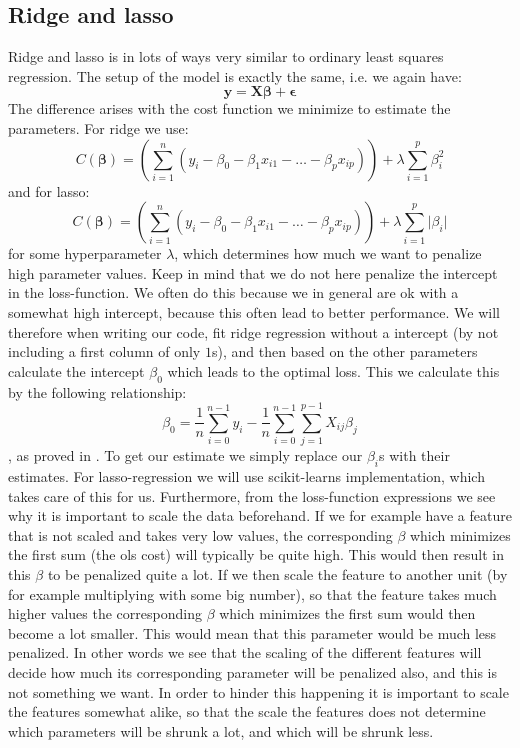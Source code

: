 \documentclass{article}
\begin{document}
\subsection{Ridge and lasso}
\label{ridge-lasso-model-sec}
Ridge and lasso is in lots of ways very similar to ordinary least squares
regression. The setup of the model is exactly the same, i.e. we again have:
$$\mathbf{y} = \mathbf{X} \bm{\beta} + \bm{\epsilon}$$
The difference arises with the cost function we minimize to estimate the parameters. For ridge we use:
$$C(\bm{\beta}) = \left(\sum_{i=1}^{n} (y_i - \beta_0 - \beta_1 x_{i 1} - \dots - \beta_{p} x_{i p})\right) + \lambda \sum_{i=1}^p \beta_i^2$$
and for lasso:
$$C(\bm{\beta}) = \left(\sum_{i=1}^{n} (y_i - \beta_0 - \beta_1 x_{i 1} - \dots - \beta_{p} x_{i p})\right) + \lambda \sum_{i=1}^p \lvert \beta_i \rvert$$
for some hyperparameter $\lambda$, which determines how much we want to penalize
high parameter values. Keep in mind that we do not here penalize the intercept
in the loss-function. We often do this because we in general are ok with a
somewhat high intercept, because this often lead to better performance. We will
therefore when writing our code, fit ridge regression without a intercept (by
not including a first column of only $1$s), and then based on the other
parameters calculate the intercept $\beta_0$ which leads to the optimal
loss. This we calculate this by the following relationship:
$$\beta_0 = \frac{1}{n} \sum_{i=0}^{n-1} y_i - \frac{1}{n} \sum_{i=0}^{n-1} \sum_{j=1}^{p-1} X_{i j} \beta_j$$
, as proved in \cite[s.~Further manipulations]{week35notes}. To get our
estimate we simply replace our $\beta_i$s with their estimates. For
lasso-regression we will use scikit-learns implementation, which takes care of
this for us. Furthermore, from the loss-function expressions we see why it is
important to scale the data beforehand. If we for example have a feature that is
not scaled and takes very low values, the corresponding $\beta$ which
minimizes the first sum (the ols cost) will typically be quite high. This would
then result in this $\beta$ to be penalized quite a lot. If we then scale the
feature to another unit (by for example multiplying with some big number), so
that the feature takes much higher values the corresponding $\beta$ which
minimizes the first sum would then become a lot smaller. This would mean that
this parameter would be much less penalized. In other words we see that the
scaling of the different features will decide how much its corresponding
parameter will be penalized also, and this is not something we want. In order to
hinder this happening it is important to scale the features somewhat alike, so
that the scale the features does not determine which parameters will be shrunk
a lot, and which will be shrunk less.
\end{document}
